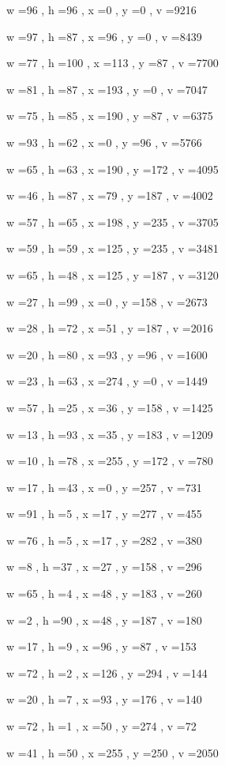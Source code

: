 \documentclass[11pt]{article}
\begin{document}
w =96 , h =96 , x =0 , y =0 , v =9216
\par
w =97 , h =87 , x =96 , y =0 , v =8439
\par
w =77 , h =100 , x =113 , y =87 , v =7700
\par
w =81 , h =87 , x =193 , y =0 , v =7047
\par
w =75 , h =85 , x =190 , y =87 , v =6375
\par
w =93 , h =62 , x =0 , y =96 , v =5766
\par
w =65 , h =63 , x =190 , y =172 , v =4095
\par
w =46 , h =87 , x =79 , y =187 , v =4002
\par
w =57 , h =65 , x =198 , y =235 , v =3705
\par
w =59 , h =59 , x =125 , y =235 , v =3481
\par
w =65 , h =48 , x =125 , y =187 , v =3120
\par
w =27 , h =99 , x =0 , y =158 , v =2673
\par
w =28 , h =72 , x =51 , y =187 , v =2016
\par
w =20 , h =80 , x =93 , y =96 , v =1600
\par
w =23 , h =63 , x =274 , y =0 , v =1449
\par
w =57 , h =25 , x =36 , y =158 , v =1425
\par
w =13 , h =93 , x =35 , y =183 , v =1209
\par
w =10 , h =78 , x =255 , y =172 , v =780
\par
w =17 , h =43 , x =0 , y =257 , v =731
\par
w =91 , h =5 , x =17 , y =277 , v =455
\par
w =76 , h =5 , x =17 , y =282 , v =380
\par
w =8 , h =37 , x =27 , y =158 , v =296
\par
w =65 , h =4 , x =48 , y =183 , v =260
\par
w =2 , h =90 , x =48 , y =187 , v =180
\par
w =17 , h =9 , x =96 , y =87 , v =153
\par
w =72 , h =2 , x =126 , y =294 , v =144
\par
w =20 , h =7 , x =93 , y =176 , v =140
\par
w =72 , h =1 , x =50 , y =274 , v =72
\par
w =41 , h =50 , x =255 , y =250 , v =2050
\par
\newpage
\end{document}
